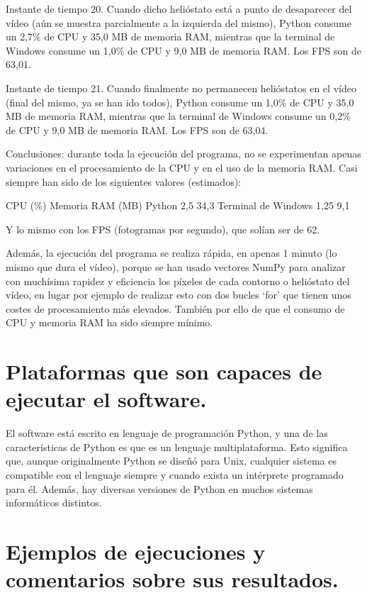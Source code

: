 \documentclass[12pt]{article}
\begin{document}
Instante de tiempo 20. Cuando dicho helióstato está a punto de desaparecer del vídeo (aún se muestra parcialmente a la izquierda del mismo), Python consume un 2,7\% de CPU y 35,0 MB de memoria RAM, mientras que la terminal de Windows consume un 1,0\% de CPU y 9,0 MB de memoria RAM. Los FPS son de 63,01.




Instante de tiempo 21. Cuando finalmente no permanecen helióstatos en el vídeo (final del mismo, ya se han ido todos), Python consume un 1,0\% de CPU y 35,0 MB de memoria RAM, mientras que la terminal de Windows consume un 0,2\% de CPU y 9,0 MB de memoria RAM. Los FPS son de 63,04.

Conclusiones: durante toda la ejecución del programa, no se experimentan apenas variaciones en el procesamiento de la CPU y en el uso de la memoria RAM. Casi siempre han sido de los siguientes valores (estimados):

				CPU (\%)	Memoria RAM (MB)
Python				2,5		34,3
Terminal de Windows		1,25		9,1

Y lo mismo con los FPS (fotogramas por segundo), que solían ser de 62.

Además, la ejecución del programa se realiza rápida, en apenas 1 minuto (lo mismo que dura el vídeo), porque se han usado vectores NumPy para analizar con muchísima rapidez y eficiencia los píxeles de cada contorno o helióstato del vídeo, en lugar por ejemplo de realizar esto con dos bucles ‘for’ que tienen unos costes de procesamiento más elevados. También por ello de que el consumo de CPU y memoria RAM ha sido siempre mínimo.


\section{Plataformas que son capaces de ejecutar el software.}

El software está escrito en lenguaje de programación Python, y una de las características de Python es que es un lenguaje multiplataforma. Esto significa que, aunque originalmente Python se diseñó para Unix, cualquier sistema es compatible con el lenguaje siempre y cuando exista un intérprete programado para él. Además, hay diversas versiones de Python en muchos sistemas informáticos distintos.


\section{Ejemplos de ejecuciones y comentarios sobre sus resultados.}
\end{document}
